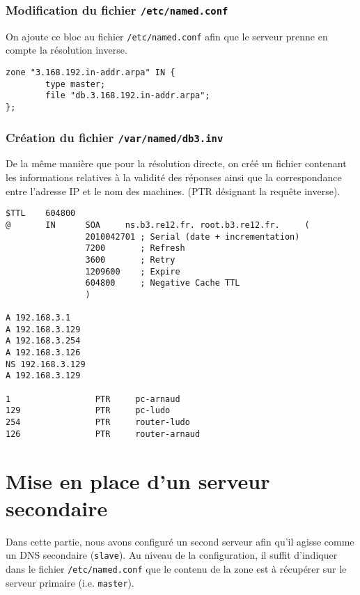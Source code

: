 \documentclass[12pt,a4paper,notitlepage]{article}
\begin{document}
\subsubsection{Modification du fichier \texttt{/etc/named.conf}}

On ajoute ce bloc au fichier \texttt{/etc/named.conf} afin que le serveur prenne en compte la résolution inverse.

\begin{lstlisting}[title=Ajout de la zone inverse à gérer]
zone "3.168.192.in-addr.arpa" IN {
        type master;
        file "db.3.168.192.in-addr.arpa";
};
\end{lstlisting}

\subsubsection{Création du fichier \texttt{/var/named/db3.inv}}
De la même manière que pour la résolution directe, on créé un fichier contenant les informations relatives à la validité des réponses ainsi que la correspondance entre l'adresse IP et le nom des machines. (PTR désignant la requête inverse).
\begin{lstlisting}[title=Paramètres de la zone inverse]
$TTL    604800
@       IN      SOA     ns.b3.re12.fr. root.b3.re12.fr.     (
                2010042701 ; Serial (date + incrementation)
                7200       ; Refresh
                3600       ; Retry
                1209600    ; Expire
                604800     ; Negative Cache TTL
                )

A 192.168.3.1
A 192.168.3.129
A 192.168.3.254
A 192.168.3.126
NS 192.168.3.129
A 192.168.3.129

1                 PTR     pc-arnaud
129               PTR     pc-ludo
254               PTR     router-ludo
126               PTR     router-arnaud
\end{lstlisting}


\clearpage
\section{Mise en place d'un serveur secondaire}

Dans cette partie, nous avons configuré un second serveur afin qu'il agisse comme un DNS secondaire (\texttt{slave}). Au niveau de la configuration, il suffit d'indiquer dans le fichier \texttt{/etc/named.conf} que le contenu de la zone est à récupérer sur le serveur primaire (i.e. \texttt{master}).\\
\end{document}
